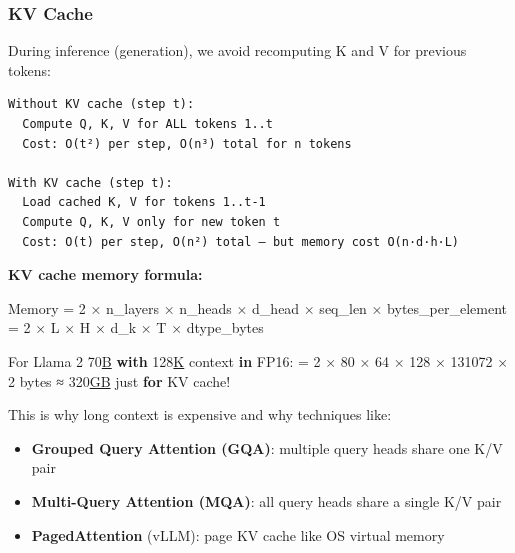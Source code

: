 \documentclass[11pt]{article}
\providecommand{\tightlist}{\setlength{\itemsep}{1pt}\setlength{\parskip}{0pt}}
\newenvironment{Shaded}{\begin{snugshade}}{\end{snugshade}}
\newcommand{\BuiltInTok}[1]{\textcolor[rgb]{0.50,0.55,0.55}{#1}}
\newcommand{\ControlFlowTok}[1]{\textcolor[rgb]{0.99,0.74,0.29}{\textbf{#1}}}
\newcommand{\DecValTok}[1]{\textcolor[rgb]{0.96,0.45,0.00}{#1}}
\newcommand{\ErrorTok}[1]{\textcolor[rgb]{0.85,0.27,0.33}{\underline{#1}}}
\newcommand{\KeywordTok}[1]{\textcolor[rgb]{0.81,0.81,0.76}{\textbf{#1}}}
\newcommand{\NormalTok}[1]{\textcolor[rgb]{0.81,0.81,0.76}{#1}}
\newcommand{\OperatorTok}[1]{\textcolor[rgb]{0.81,0.81,0.76}{#1}}
\begin{document}
\subsubsection{KV Cache}\label{kv-cache}

During inference (generation), we avoid recomputing K and V for previous tokens:

\setcodelang{}

\begin{verbatim}
Without KV cache (step t):
  Compute Q, K, V for ALL tokens 1..t
  Cost: O(t²) per step, O(n³) total for n tokens

With KV cache (step t):
  Load cached K, V for tokens 1..t-1
  Compute Q, K, V only for new token t
  Cost: O(t) per step, O(n²) total — but memory cost O(n·d·h·L)
\end{verbatim}

\textbf{KV cache memory formula:}


\begin{Shaded}
\begin{Highlighting}[]
\NormalTok{Memory }\OperatorTok{=} \DecValTok{2}\NormalTok{ × n\_layers × n\_heads × d\_head × seq\_len × bytes\_per\_element}
       \OperatorTok{=} \DecValTok{2}\NormalTok{ × L × H × d\_k × T × dtype\_bytes}

\NormalTok{For Llama }\DecValTok{2} \DecValTok{70}\ErrorTok{B} \ControlFlowTok{with} \DecValTok{128}\ErrorTok{K}\NormalTok{ context }\KeywordTok{in}\NormalTok{ FP16:}
  \OperatorTok{=} \DecValTok{2}\NormalTok{ × }\DecValTok{80}\NormalTok{ × }\DecValTok{64}\NormalTok{ × }\DecValTok{128}\NormalTok{ × }\DecValTok{131072}\NormalTok{ × }\DecValTok{2} \BuiltInTok{bytes}\NormalTok{ ≈ }\DecValTok{320}\ErrorTok{GB}\NormalTok{ just }\ControlFlowTok{for}\NormalTok{ KV cache}\OperatorTok{!}
\end{Highlighting}
\end{Shaded}

This is why long context is expensive and why techniques like:

\begin{itemize}
\tightlist
\item
  \textbf{Grouped Query Attention (GQA)}: multiple query heads share one K/V pair
\item
  \textbf{Multi-Query Attention (MQA)}: all query heads share a single K/V pair
\item
  \textbf{PagedAttention} (vLLM): page KV cache like OS virtual memory
\end{itemize}
\end{document}
